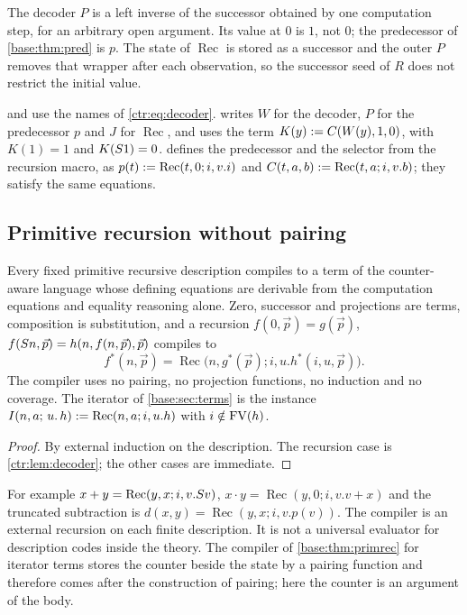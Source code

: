 The decoder $P$ is a left inverse of the successor obtained by one computation step, for an
arbitrary open argument. Its value at $0$ is $1$, not $0$; the predecessor of
\cref{base:thm:pred} is $p$. The state of $\operatorname{Rec}$ is stored as a successor and
the outer $P$ removes that wrapper after each observation, so the successor seed of $R$ does
not restrict the initial value.

\begin{remark}
 and  use the names of
\eqref{ctr:eq:decoder}.  writes $W$ for the decoder, $P$ for the
predecessor $p$ and $J$ for $\operatorname{Rec}$, and uses the term
$K(y)\mathrel{:=} C(W(y),1,0)$, with $K(1)=1$ and $K(S 1)=0$.  defines
the predecessor and the selector from the recursion macro, as
$p(t)\mathrel{:=}\operatorname{Rec}(t,0;i,v.i)$ and $C(t,a,b)\mathrel{:=}\operatorname{Rec}(t,a;i,v.b)$;
they satisfy the same equations.
\end{remark}

\subsection{Primitive recursion without pairing}

\begin{theorem}\label{ctr:thm:compiler}
Every fixed primitive recursive description compiles to a term of the counter-aware
language whose defining equations are derivable from the computation equations and equality
reasoning alone. Zero, successor and projections are terms, composition is substitution, and
a recursion $f(0,\vec p)=g(\vec p)$, $f(S n,\vec p)=h(n,f(n,\vec p),\vec p)$ compiles to
\[
 f^*(n,\vec p)=\operatorname{Rec}\bigl(n,g^*(\vec p);i,u.h^*(i,u,\vec p)\bigr).
\]
The compiler uses no pairing, no projection functions, no induction and no coverage. The
iterator of \cref{base:sec:terms} is the instance
$I(n,a;\,u.\,h)\mathrel{:=}\operatorname{Rec}(n,a;i,u.h)$ with $i\notin\operatorname{FV}(h)$.
\end{theorem}
\begin{proof}
By external induction on the description. The recursion case is \cref{ctr:lem:decoder};
the other cases are immediate.
\end{proof}

For example $x+y=\operatorname{Rec}(y,x;i,v.S v)$,
$x\cdot y=\operatorname{Rec}(y,0;i,v.v+x)$ and the truncated subtraction is
$d(x,y)=\operatorname{Rec}(y,x;i,v.p(v))$. The compiler is an external recursion on each
finite description. It is not a universal evaluator for description codes inside the theory.
The compiler of \cref{base:thm:primrec} for iterator terms stores the counter beside the
state by a pairing function and therefore comes after the construction of pairing; here the
counter is an argument of the body.

